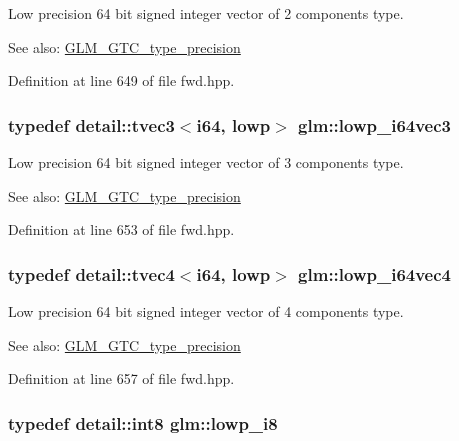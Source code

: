 Low precision 64 bit signed integer vector of 2 components type. \begin{Desc}
\item[See also:]\hyperlink{group__gtc__type__precision}{GLM\_\-GTC\_\-type\_\-precision} \end{Desc}


Definition at line 649 of file fwd.hpp.\hypertarget{group__gtc__type__precision_ga42f666ccdb6d1ef6326882b4f377678}{
\subsubsection[lowp\_\-i64vec3]{\setlength{\rightskip}{0pt plus 5cm}typedef detail::tvec3$<$i64, lowp$>$ {\bf glm::lowp\_\-i64vec3}}}
\label{group__gtc__type__precision_ga42f666ccdb6d1ef6326882b4f377678}


Low precision 64 bit signed integer vector of 3 components type. \begin{Desc}
\item[See also:]\hyperlink{group__gtc__type__precision}{GLM\_\-GTC\_\-type\_\-precision} \end{Desc}


Definition at line 653 of file fwd.hpp.\hypertarget{group__gtc__type__precision_g95c13b9d4f94d1783e7d96534d1651d8}{
\subsubsection[lowp\_\-i64vec4]{\setlength{\rightskip}{0pt plus 5cm}typedef detail::tvec4$<$i64, lowp$>$ {\bf glm::lowp\_\-i64vec4}}}
\label{group__gtc__type__precision_g95c13b9d4f94d1783e7d96534d1651d8}


Low precision 64 bit signed integer vector of 4 components type. \begin{Desc}
\item[See also:]\hyperlink{group__gtc__type__precision}{GLM\_\-GTC\_\-type\_\-precision} \end{Desc}


Definition at line 657 of file fwd.hpp.\hypertarget{group__gtc__type__precision_ga2e13ee29c90f75658beed6082541097}{
\subsubsection[lowp\_\-i8]{\setlength{\rightskip}{0pt plus 5cm}typedef detail::int8 {\bf glm::lowp\_\-i8}}}
\label{group__gtc__type__precision_ga2e13ee29c90f75658beed6082541097}


